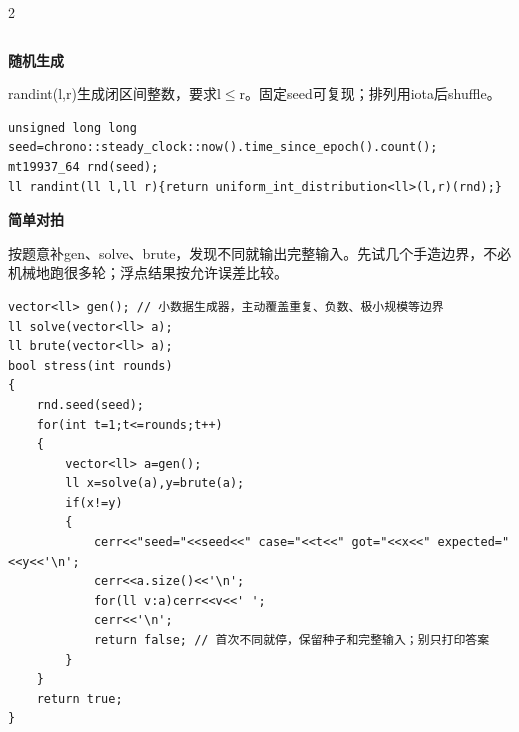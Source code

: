 \documentclass[UTF8,fontset=fandol,a4paper,twoside]{ctexart}
\newcommand{\topic}[1]{\par\smallskip\textbf{#1}\par\nobreak}
\newcommand{\note}[1]{{\fontsize{10}{12}\selectfont #1\par}}
\begin{document}
\begin{multicols}{2}
\begin{lstlisting}
\end{lstlisting}
\topic{随机生成}
\note{randint(\allowbreak{}l,\allowbreak{}r)\allowbreak{}生成闭区间整数，要求l\ensuremath{\le}r。固定seed可复现；排列用iota后shuffle。}
\begin{lstlisting}
unsigned long long seed=chrono::steady_clock::now().time_since_epoch().count();
mt19937_64 rnd(seed);
ll randint(ll l,ll r){return uniform_int_distribution<ll>(l,r)(rnd);}
\end{lstlisting}
\topic{简单对拍}
\note{按题意补gen、solve、brute，发现不同就输出完整输入。先试几个手造边界，不必机械地跑很多轮；浮点结果按允许误差比较。}
\begin{lstlisting}
vector<ll> gen(); // 小数据生成器，主动覆盖重复、负数、极小规模等边界
ll solve(vector<ll> a);
ll brute(vector<ll> a);
bool stress(int rounds)
{
    rnd.seed(seed);
    for(int t=1;t<=rounds;t++)
    {
        vector<ll> a=gen();
        ll x=solve(a),y=brute(a);
        if(x!=y)
        {
            cerr<<"seed="<<seed<<" case="<<t<<" got="<<x<<" expected="<<y<<'\n';
            cerr<<a.size()<<'\n';
            for(ll v:a)cerr<<v<<' ';
            cerr<<'\n';
            return false; // 首次不同就停，保留种子和完整输入；别只打印答案
        }
    }
    return true;
}
\end{lstlisting}

\end{multicols}
\end{document}
